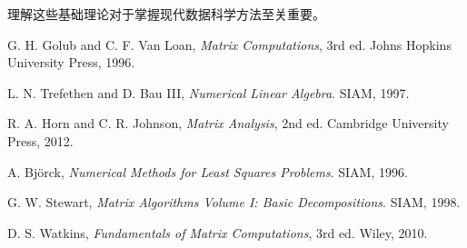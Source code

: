 \documentclass[11pt,a4paper]{ctexart}
\theoremstyle{definition}
\begin{document}
理解这些基础理论对于掌握现代数据科学方法至关重要。

\begin{thebibliography}{99}
G. H. Golub and C. F. Van Loan,
\textit{Matrix Computations}, 3rd ed.
Johns Hopkins University Press, 1996.

L. N. Trefethen and D. Bau III,
\textit{Numerical Linear Algebra}.
SIAM, 1997.

R. A. Horn and C. R. Johnson,
\textit{Matrix Analysis}, 2nd ed.
Cambridge University Press, 2012.

A. Björck,
\textit{Numerical Methods for Least Squares Problems}.
SIAM, 1996.

G. W. Stewart,
\textit{Matrix Algorithms Volume I: Basic Decompositions}.
SIAM, 1998.

D. S. Watkins,
\textit{Fundamentals of Matrix Computations}, 3rd ed.
Wiley, 2010.
\end{thebibliography}
\end{document}
